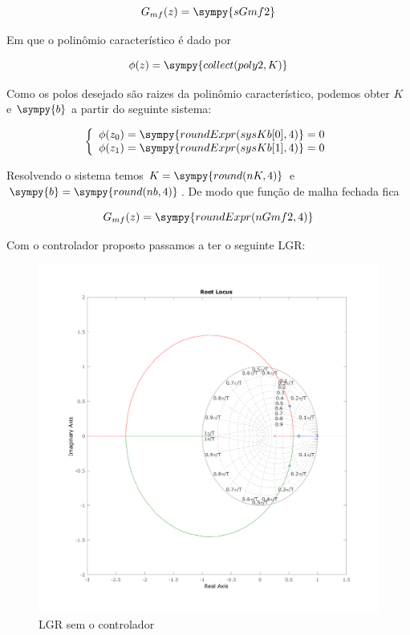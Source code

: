 \documentclass[a4paper,11pt]{article}
\newcommand{\npy}[1]{\sympy{round(#1,4)}}
\begin{document}
\begin{equation}
    G_{mf}(z) = \sympy{sGmf2}
\end{equation}

Em que o polinômio característico é dado por

\begin{equation}
    \phi(z) = \sympy{collect(poly2,K)}
\end{equation}

Como os polos desejado são raizes da polinômio característico, podemos obter $K$ e $\sympy{b}$ a partir do seguinte sistema:

$$
\left\{
\begin{array}{l}
    \phi(z_0) = \sympy{roundExpr(sysKb[0],4)} = 0\\
    \phi(z_1) = \sympy{roundExpr(sysKb[1],4)} = 0
\end{array}
\right.
$$

Resolvendo o sistema temos $K = \npy{nK}$ e $\sympy{b} = \npy{nb}$. De modo que função de malha fechada fica

\begin{equation}
    G_{mf}(z) = \sympy{roundExpr(nGmf2,4)}
\end{equation}

Com o controlador proposto passamos a ter o seguinte LGR:

\begin{figure}[H]
    \centering
    \includegraphics[width=0.9\linewidth]{img/exsim3-rlocus-g2-control.png}
    \caption{LGR sem o controlador}
    \label{fig:ex3-rlocus-g2-control}
\end{figure}
\end{document}
